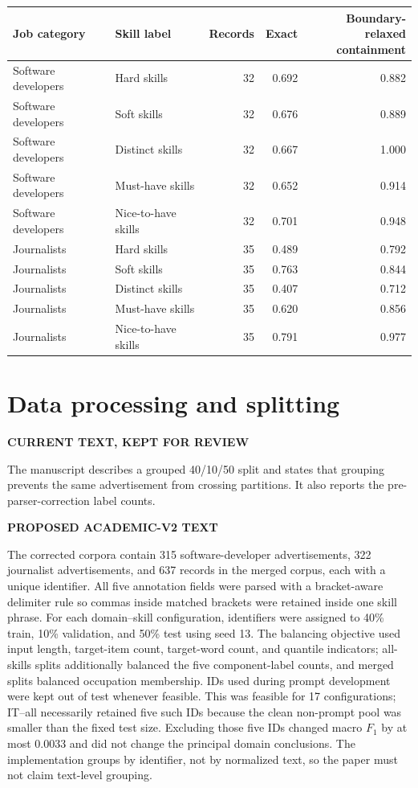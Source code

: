 \documentclass[11pt,a4paper]{article}
\newenvironment{OldBlock}
  {\definecolor{shadecolor}{RGB}{255,230,230}\begin{shaded}\begingroup\textbf{CURRENT TEXT, KEPT FOR REVIEW}\par\color{red!70!black}}
  {\endgroup\end{shaded}}
\newenvironment{NewBlock}
  {\definecolor{shadecolor}{RGB}{199,235,255}\begin{shaded}\begingroup\textbf{PROPOSED ACADEMIC-V2 TEXT}\par\color{newink}}
  {\endgroup\end{shaded}}
\begin{document}
\begin{center}
\small
\begin{tabular}{llrrr}
\toprule
Job category & Skill label & Records & Exact & \shortstack{Boundary-relaxed\\containment} \\
\midrule
Software developers & Hard skills & 32 & 0.692 & 0.882 \\
Software developers & Soft skills & 32 & 0.676 & 0.889 \\
Software developers & Distinct skills & 32 & 0.667 & 1.000 \\
Software developers & Must-have skills & 32 & 0.652 & 0.914 \\
Software developers & Nice-to-have skills & 32 & 0.701 & 0.948 \\
Journalists & Hard skills & 35 & 0.489 & 0.792 \\
Journalists & Soft skills & 35 & 0.763 & 0.844 \\
Journalists & Distinct skills & 35 & 0.407 & 0.712 \\
Journalists & Must-have skills & 35 & 0.620 & 0.856 \\
Journalists & Nice-to-have skills & 35 & 0.791 & 0.977 \\
\bottomrule
\end{tabular}
\end{center}

\section{Data processing and splitting}
\begin{OldBlock}
The manuscript describes a grouped 40/10/50 split and states that grouping
prevents the same advertisement from crossing partitions. It also reports the
pre-parser-correction label counts.
\end{OldBlock}
\begin{NewBlock}
The corrected corpora contain 315 software-developer advertisements, 322
journalist advertisements, and 637 records in the merged corpus, each with a
unique identifier. All five annotation fields were parsed with a bracket-aware
delimiter rule so commas inside matched brackets were retained inside one
skill phrase. For each domain--skill configuration, identifiers were assigned
to 40\% train, 10\% validation, and 50\% test using seed 13. The balancing
objective used input length, target-item count, target-word count, and quantile
indicators; all-skills splits additionally balanced the five component-label
counts, and merged splits balanced occupation membership. IDs used during
prompt development were kept out of test whenever feasible. This was feasible
for 17 configurations; IT--all necessarily retained five such IDs because the
clean non-prompt pool was smaller than the fixed test size. Excluding those
five IDs changed macro $F_1$ by at most 0.0033 and did not change the principal
domain conclusions. The implementation groups by identifier, not by normalized
text, so the paper must not claim text-level grouping.
\end{NewBlock}
\end{document}
